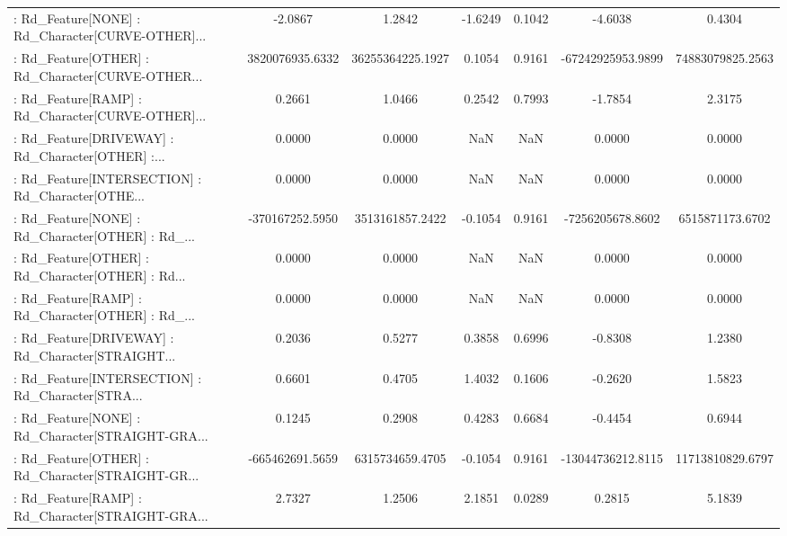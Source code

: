 \begin{longtable}{p{4cm}cccccc}
 : Rd\_Feature[NONE] : Rd\_Character[CURVE-OTHER]... &           -2.0867 &            1.2842 & -1.6249 &       0.1042 &            -4.6038 &            0.4304 \\
 : Rd\_Feature[OTHER] : Rd\_Character[CURVE-OTHER... &   3820076935.6332 &  36255364225.1927 &  0.1054 &       0.9161 &  -67242925953.9899 &  74883079825.2563 \\
 : Rd\_Feature[RAMP] : Rd\_Character[CURVE-OTHER]... &            0.2661 &            1.0466 &  0.2542 &       0.7993 &            -1.7854 &            2.3175 \\
 : Rd\_Feature[DRIVEWAY] : Rd\_Character[OTHER] :... &            0.0000 &            0.0000 &     NaN &          NaN &             0.0000 &            0.0000 \\
 : Rd\_Feature[INTERSECTION] : Rd\_Character[OTHE... &            0.0000 &            0.0000 &     NaN &          NaN &             0.0000 &            0.0000 \\
 : Rd\_Feature[NONE] : Rd\_Character[OTHER] : Rd\_... &   -370167252.5950 &   3513161857.2422 & -0.1054 &       0.9161 &   -7256205678.8602 &   6515871173.6702 \\
 : Rd\_Feature[OTHER] : Rd\_Character[OTHER] : Rd... &            0.0000 &            0.0000 &     NaN &          NaN &             0.0000 &            0.0000 \\
 : Rd\_Feature[RAMP] : Rd\_Character[OTHER] : Rd\_... &            0.0000 &            0.0000 &     NaN &          NaN &             0.0000 &            0.0000 \\
 : Rd\_Feature[DRIVEWAY] : Rd\_Character[STRAIGHT... &            0.2036 &            0.5277 &  0.3858 &       0.6996 &            -0.8308 &            1.2380 \\
 : Rd\_Feature[INTERSECTION] : Rd\_Character[STRA... &            0.6601 &            0.4705 &  1.4032 &       0.1606 &            -0.2620 &            1.5823 \\
 : Rd\_Feature[NONE] : Rd\_Character[STRAIGHT-GRA... &            0.1245 &            0.2908 &  0.4283 &       0.6684 &            -0.4454 &            0.6944 \\
 : Rd\_Feature[OTHER] : Rd\_Character[STRAIGHT-GR... &   -665462691.5659 &   6315734659.4705 & -0.1054 &       0.9161 &  -13044736212.8115 &  11713810829.6797 \\
 : Rd\_Feature[RAMP] : Rd\_Character[STRAIGHT-GRA... &            2.7327 &            1.2506 &  2.1851 &       0.0289 &             0.2815 &            5.1839 \\

\end{longtable}
